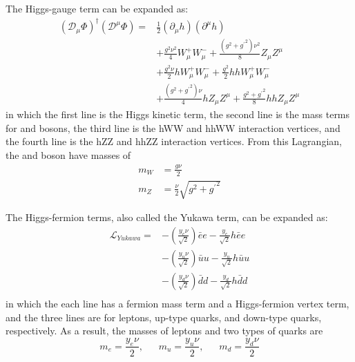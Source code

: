 The Higgs-gauge term can be expanded as:
\begin{equation}\label{eq:Higgs_gauge}
  \begin{split}
    (\mathcal{D}_{\mu}\Phi)^{\dagger} (\mathcal{D}^{\mu}\Phi) = &   \frac{1}{2} (\partial_{\mu} h)(\partial^{\mu} h) \\
                                                                & + \frac{g^{2}\nu^{2}}{4} W^{+}_{\mu} W^{-}_{\mu}
                                                                  + \frac{(g^{2}+{g^{\prime}}^{2}) \nu^{2}}{8} Z_{\mu} Z^{\mu} \\
                                                                & + \frac{g^{2}\nu}{2} h W^{+}_{\mu} W^{-}_{\mu}
                                                                  + \frac{g^{2}}{2} hh W^{+}_{\mu} W^{-}_{\mu} \\
                                                                & + \frac{(g^{2}+{g^{\prime}}^{2}) \nu}{4} h Z_{\mu} Z^{\mu}
                                                                  + \frac{g^{2}+{g^{\prime}}^{2}}{8} hh Z_{\mu} Z^{\mu}
  \end{split}
\end{equation} 
in which the first line is the Higgs kinetic term, the second line is the mass terms for \PW and \PZ bosons,
the third line is the hWW and hhWW interaction vertices, and the fourth line is the hZZ and hhZZ interaction vertices.
From this Lagrangian, the \PW and \PZ boson have masses of 
\begin{equation}\label{eq:gauge_mass}
  \begin{split}
    m_{W} & = \frac{g\nu}{2} \\
    m_{Z} & = \frac{\nu}{2} \sqrt{g^{2}+{g^{\prime}}^{2}}
  \end{split}
\end{equation}

The Higgs-fermion terms, also called the Yukawa term, can be expanded as:
\begin{equation}\label{eq:Higgs_Yukawa}
  \begin{split}
    \mathcal{L}_{Yukawa} = & - (\frac{y_{e}\nu}{\sqrt{2}}) \bar{e}e - \frac{y_{e}}{\sqrt{2}} h \bar{e}e \\
                           & - (\frac{y_{u}\nu}{\sqrt{2}}) \bar{u}u - \frac{y_{u}}{\sqrt{2}} h \bar{u}u \\
                           & - (\frac{y_{d}\nu}{\sqrt{2}}) \bar{d}d - \frac{y_{d}}{\sqrt{2}} h \bar{d}d \\
  \end{split}
\end{equation}
in which the each line has a fermion mass term and a Higgs-fermion vertex term,
and the three lines are for leptons, up-type quarks, and down-type quarks, respectively.
As a result, the masses of leptons and two types of quarks are
\begin{equation}\label{eq:fermion_mass}
    m_{e} = \frac{y_{e}\nu}{2}, ~~~~~~~  m_{u} = \frac{y_{u}\nu}{2}, ~~~~~~~  m_{d} = \frac{y_{d}\nu}{2}
\end{equation}

